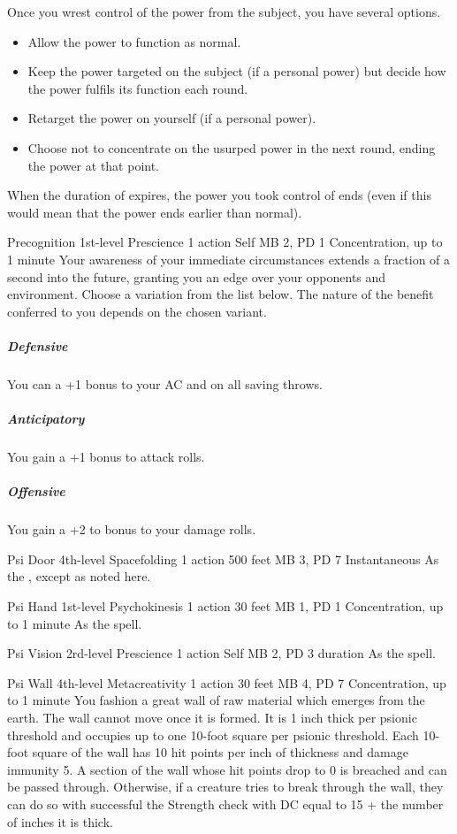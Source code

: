   Once you wrest control of the power from the subject,
  you have several options.
  \begin{itemize}
    \item Allow the power to function as normal.
    \item Keep the power targeted on the subject
          (if a personal power) but decide how the power
          fulfils its function each round.
    \item Retarget the power on yourself (if a personal power).
    \item Choose not to concentrate on the usurped power
            in the next round, ending the power at that point.
  \end{itemize}
When the duration of  expires,
the power you took control of ends
(even if this would mean that the power ends earlier than normal).

\DndPowerHeader%
  {Precognition}
  {1st-level Prescience}
  {1 action}
  {Self}
  {MB 2, PD 1}
  {Concentration, up to 1 minute}
Your awareness of your immediate circumstances extends
a fraction of a second into the future,
granting you an edge over your opponents and environment.
Choose a variation from the list below.
The nature of the benefit conferred to you
depends on the chosen variant.
\subparagraph{Defensive}
  You can a +1 bonus to your AC and on all saving throws.
\subparagraph{Anticipatory}
  You gain a +1 bonus to attack rolls.
\subparagraph{Offensive}
  You gain a +2 to bonus to your damage rolls.

\DndPowerHeader%
  {Psi Door}
  {4th-level Spacefolding}
  {1 action}
  {500 feet}
  {MB 3, PD 7}
  {Instantaneous}
As the , except as noted here.

\DndPowerHeader%
  {Psi Hand}
  {1st-level Psychokinesis}
  {1 action}
  {30 feet}
  {MB 1, PD 1}
  {Concentration, up to 1 minute}
As the  spell.

\DndPowerHeader%
  {Psi Vision}
  {2rd-level Prescience}
  {1 action}
  {Self}
  {MB 2, PD 3}
  {duration}
As the  spell.

\DndPowerHeader%
  {Psi Wall}
  {4th-level Metacreativity}
  {1 action}
  {30 feet}
  {MB 4, PD 7}
  {Concentration, up to 1 minute}
You fashion a great wall of raw material which emerges from the earth.
The wall cannot move once it is formed.
It is 1 inch thick per psionic threshold
and occupies up to one 10-foot square per psionic threshold.
Each 10-foot square of the wall has 10 hit points per inch of thickness
and damage immunity 5.
A section of the wall whose hit points drop to 0 is breached
and can be passed through.
Otherwise, if a creature tries to break through the wall,
they can do so with successful the Strength check with
DC equal to 15 + the number of inches it is thick.

